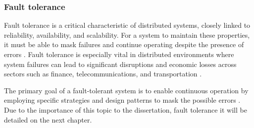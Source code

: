 \begin{comment}
In distributed systems, scalability can be approached in three distinct dimensions \cite{Tanenbaum2023}:

\begin{enumerate}
	\item \textbf{Size scalability}: This allows the system to accommodate additional resources and users without a decrease in performance or reliability, ensuring that the system continues to deliver the expected results.
	      	      	      	      
	\item \textbf{Geographical scalability}: This dimension addresses the ability to maintain system performance despite the physical distance between users and resources. Geographical scalability mitigates latency and network constraints that may arise due to long distance communication.
	      	      	      	      
	\item \textbf{Administrative scalability}: This type of scalability enables the system to handle increasing administrative complexity, such as when separate nodes have different management responsibilities. For example, one set of nodes might handle financial transactions only adding the fact of allowing write-only operations to a specific range os users. As these constraints and requirements grow, the system must adapt to maintain efficient operation.
\end{enumerate}
\end{comment}

\subsubsection{Fault tolerance}

Fault tolerance is a critical characteristic of distributed systems, closely linked to reliability, availability, and scalability. For a system to maintain these properties, it must be able to mask failures and continue operating despite the presence of errors \cite{Strigini2012}. Fault tolerance is especially vital in distributed environments where system failures can lead to significant disruptions and economic losses across sectors such as finance, telecommunications, and transportation \cite{Sari2015}.

The primary goal of a fault-tolerant system is to enable continuous operation by employing specific strategies and design patterns to mask the possible errors \cite{Kleppmann2017}. Due to the importance of this topic to the dissertation, fault tolerance it will be detailed on the next chapter.

